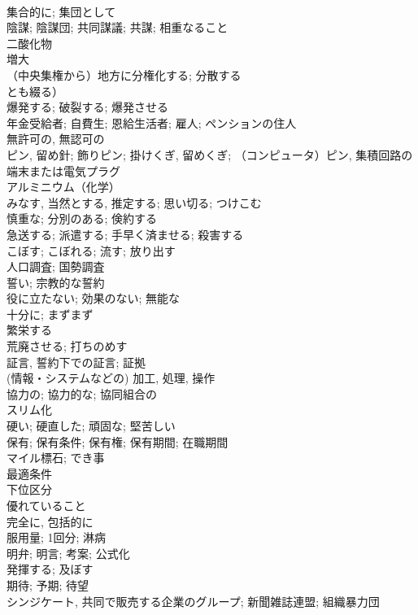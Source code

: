 \documentclass[8pt]{extreport}
\begin{document}
\begin{CJK}{UTF8}{min}
\\	集合的に; 集団として	
\\	陰謀; 陰謀団; 共同謀議; 共謀; 相重なること	
\\	二酸化物	
\\	増大	
\\	（中央集権から）地方に分権化する; 分散する
\\	とも綴る）	
\\	爆発する; 破裂する; 爆発させる	
\\	年金受給者; 自費生; 恩給生活者; 雇人; ペンションの住人	
\\	無許可の, 無認可の	
\\	ピン, 留め針; 飾りピン; 掛けくぎ, 留めくぎ; （コンピュータ）ピン, 集積回路の端末または電気プラグ	
\\	アルミニウム（化学）	
\\	みなす, 当然とする, 推定する; 思い切る; つけこむ	
\\	慎重な; 分別のある; 倹約する	
\\	急送する; 派遣する; 手早く済ませる; 殺害する	
\\	こぼす; こぼれる; 流す; 放り出す	
\\	人口調査; 国勢調査	
\\	誓い; 宗教的な誓約	
\\	役に立たない; 効果のない; 無能な	
\\	十分に; まずまず	
\\	繁栄する	
\\	荒廃させる; 打ちのめす	
\\	証言, 誓約下での証言; 証拠	
\\	(情報・システムなどの) 加工, 処理, 操作	
\\	協力の; 協力的な; 協同組合の	
\\	スリム化	
\\	硬い; 硬直した; 頑固な; 堅苦しい	
\\	保有; 保有条件; 保有権; 保有期間; 在職期間	
\\	マイル標石; でき事	
\\	最適条件	
\\	下位区分	
\\	優れていること	
\\	完全に, 包括的に	
\\	服用量; 1回分; 淋病	
\\	明弁; 明言; 考案; 公式化	
\\	発揮する; 及ぼす	
\\	期待; 予期; 待望	
\\	シンジケート, 共同で販売する企業のグループ; 新聞雑誌連盟; 組織暴力団	

\end{CJK}
\end{document}
